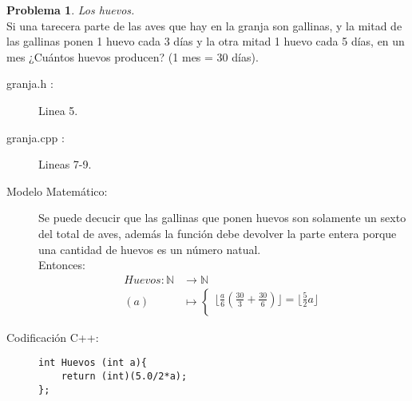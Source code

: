 \documentclass{article}
\theoremstyle{plain}
\theoremstyle{definition}
\newtheorem{problem}{Problema}
\begin{document}
\begin{problem} \emph{Los huevos.}\\
\hspace*{7mm}Si una tarecera parte de las aves que hay en la granja son gallinas, y la mitad de las gallinas ponen 1 huevo cada 3 días y la otra mitad 1 huevo cada 5 días, en un mes ¿Cuántos huevos producen? (1 mes = 30 días).
%
\begin{description}
\item[granja.h :] Linea 5. \item[granja.cpp :] Lineas 7-9.

\item[Modelo Matemático:]
%
Se puede decucir que las gallinas que ponen huevos son solamente un sexto del total de aves, además la función debe devolver la parte entera porque una cantidad de huevos es un número natual. \\
Entonces:
\begin{align*}
Huevos: \mathbb{N} &\to \mathbb{N}\\
(a) &\mapsto
\begin{cases}
\lfloor\frac{a}{6}\left(\frac{30}{3}+\frac{30}{6}\right)\rfloor = \lfloor\frac{5}{2}a\rfloor\\
\end{cases}
\end{align*}
\item[Codificación \textsf{C++}:]\hfill

%
\begin{verbatim}
int Huevos (int a){
    return (int)(5.0/2*a);
};
\end{verbatim}
\end{description}
\end{problem}
\end{document}
